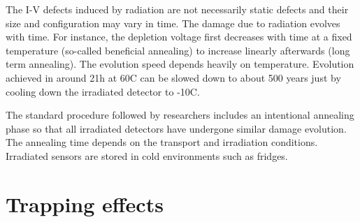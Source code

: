 The I-V defects induced by radiation are not necessarily static defects and their size and configuration may vary in time. The damage due to radiation evolves with time. For instance, the depletion voltage first decreases with time at a fixed temperature (so-called beneficial annealing) to increase linearly afterwards (long term annealing). The evolution speed depends heavily on temperature. Evolution achieved in around 21h at 60C can be slowed down to about 500 years just by cooling down the irradiated detector to -10C. 

The standard procedure followed by researchers includes an intentional annealing phase so that all irradiated detectors have undergone similar damage evolution. The annealing time depends on the transport and irradiation conditions. Irradiated sensors are stored in cold environments such as fridges.


\section{Trapping effects} %
\label{sec:trapEfect}



